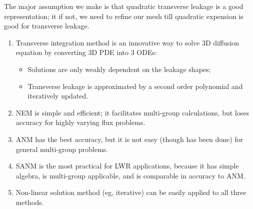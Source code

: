 \documentclass{school-22.211-notes}
\begin{document}
\clearpage
{}
The major assumption we make is that quadratic transverse leakage is a good representation; it if not, we need to refine our mesh till quadratic expension is good for transverse leakage. 
\begin{enumerate}
\item Transverse integration method is an innovative way to solve 3D diffusion equation by converting 3D PDE into 3 ODEs: 
  \begin{itemize}
    \item Solutions are only weakly dependent on the leakage shapes;
    \item Transverse leakage is approximated by a second order polynomial and iteratively updated.
  \end{itemize}

\item NEM is simple and efficient; it facilitates multi-group calculations, but loses accuracy for highly varying flux problems. 

\item ANM has the best accuracy, but it is not easy (though has been done) for general multi-group problems.

\item SANM is the most practical for LWR applications, because it has simple algebra, is multi-group applicable, and is comparable in accuracy to ANM. 

\item Non-linear solution method (eg, iterative) can be easily applied to all three methods. 
\end{enumerate}



\clearpage
\end{document}
